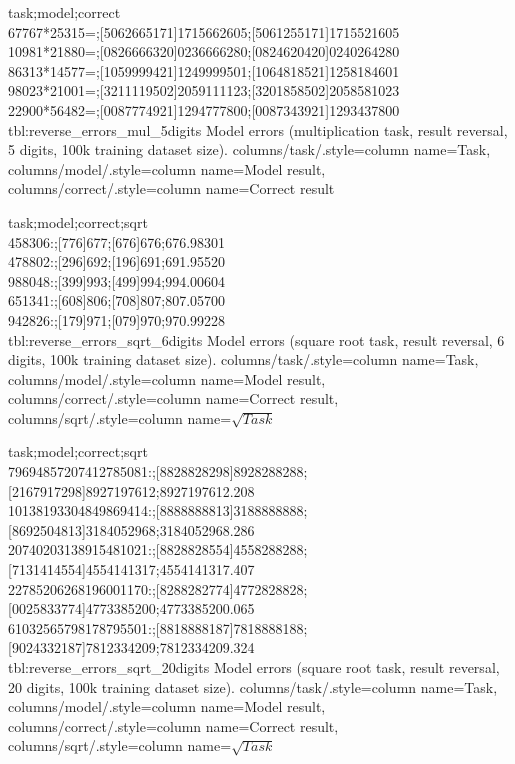{
	task;model;correct\\
	67767*25315=;[5062665171]1715662605;[5061255171]1715521605\\
	10981*21880=;[0826666320]0236666280;[0824620420]0240264280\\
	86313*14577=;[1059999421]1249999501;[1064818521]1258184601\\
	98023*21001=;[3211119502]2059111123;[3201858502]2058581023\\
	22900*56482=;[0087774921]1294777800;[0087343921]1293437800\\
}
{tbl:reverse_errors_mul_5digits}
{
	Model errors (multiplication task, result reversal, 5 digits, 100k training dataset size).
}
{
	columns/task/.style={column name={Task}},
	columns/model/.style={column name={Model result}},
	columns/correct/.style={column name={Correct result}}
}



{
	task;model;correct;sqrt\\
	458306:;[776]677;[676]676;676.98301\\
	478802:;[296]692;[196]691;691.95520\\
	988048:;[399]993;[499]994;994.00604\\
	651341:;[608]806;[708]807;807.05700\\
	942826:;[179]971;[079]970;970.99228\\
}
{tbl:reverse_errors_sqrt_6digits}
{
	Model errors (square root task, result reversal, 6 digits, 100k training dataset size).
}
{
	columns/task/.style={column name={Task}},
	columns/model/.style={column name={Model result}},
	columns/correct/.style={column name={Correct result}},
	columns/sqrt/.style={column name={$\sqrt{Task}$}}
}

{
	task;model;correct;sqrt\\
	79694857207412785081:;[8828828298]8928288288;[2167917298]8927197612;8927197612.208\\
	10138193304849869414:;[8888888813]3188888888;[8692504813]3184052968;3184052968.286\\
	20740203138915481021:;[8828828554]4558288288;[7131414554]4554141317;4554141317.407\\
	22785206268196001170:;[8288282774]4772828828;[0025833774]4773385200;4773385200.065\\
	61032565798178795501:;[8818888187]7818888188;[9024332187]7812334209;7812334209.324\\
}
{tbl:reverse_errors_sqrt_20digits}
{
	Model errors (square root task, result reversal, 20 digits, 100k training dataset size).
}
{
	columns/task/.style={column name={Task}},
	columns/model/.style={column name={Model result}},
	columns/correct/.style={column name={Correct result}},
	columns/sqrt/.style={column name={$\sqrt{Task}$}}
}


